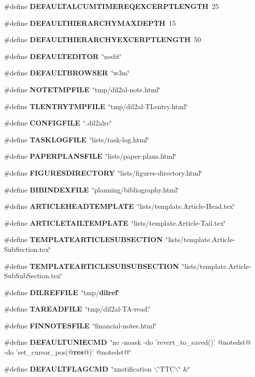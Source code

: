 \begin{CompactItemize}
\item 
\#define {\bf DEFAULTALCUMTIMEREQEXCERPTLENGTH}\ 25
\item 
\#define {\bf DEFAULTHIERARCHYMAXDEPTH}\ 15
\item 
\#define {\bf DEFAULTHIERARCHYEXCERPTLENGTH}\ 50
\item 
\#define {\bf DEFAULTEDITOR}\ \char`\"{}nedit\char`\"{}
\item 
\#define {\bf DEFAULTBROWSER}\ \char`\"{}w3m\char`\"{}
\item 
\#define {\bf NOTETMPFILE}\ \char`\"{}tmp/dil2al-note.html\char`\"{}
\item 
\#define {\bf TLENTRYTMPFILE}\ \char`\"{}tmp/dil2al-TLentry.html\char`\"{}
\item 
\#define {\bf CONFIGFILE}\ \char`\"{}.dil2alrc\char`\"{}
\item 
\#define {\bf TASKLOGFILE}\ \char`\"{}lists/task-log.html\char`\"{}
\item 
\#define {\bf PAPERPLANSFILE}\ \char`\"{}lists/paper-plans.html\char`\"{}
\item 
\#define {\bf FIGURESDIRECTORY}\ \char`\"{}lists/figures-directory.html\char`\"{}
\item 
\#define {\bf BIBINDEXFILE}\ \char`\"{}planning/bibliography.html\char`\"{}
\item 
\#define {\bf ARTICLEHEADTEMPLATE}\ \char`\"{}lists/template.Article-Head.tex\char`\"{}
\item 
\#define {\bf ARTICLETAILTEMPLATE}\ \char`\"{}lists/template.Article-Tail.tex\char`\"{}
\item 
\#define {\bf TEMPLATEARTICLESUBSECTION}\ \char`\"{}lists/template.Article-Sub\-Section.tex\char`\"{}
\item 
\#define {\bf TEMPLATEARTICLESUBSUBSECTION}\ \char`\"{}lists/template.Article-Sub\-Sub\-Section.tex\char`\"{}
\item 
\#define {\bf DILREFFILE}\ \char`\"{}tmp/{\bf dilref}\char`\"{}
\item 
\#define {\bf TAREADFILE}\ \char`\"{}tmp/dil2al-TA-read.\char`\"{}
\item 
\#define {\bf FINNOTESFILE}\ \char`\"{}financial-notes.html\char`\"{}
\item 
\#define {\bf DEFAULTUNIECMD}\ \char`\"{}nc -noask -do 'revert\_\-to\_\-saved()' @notedst@ -do 'set\_\-cursor\_\-pos(@{\bf res}@)' @notedst@\char`\"{}
\item 
\#define {\bf DEFAULTFLAGCMD}\ \char`\"{}xnotification $\backslash$\char`\"{}TTC$\backslash$\char`\"{} \&\char`\"{}

\end{CompactItemize}
